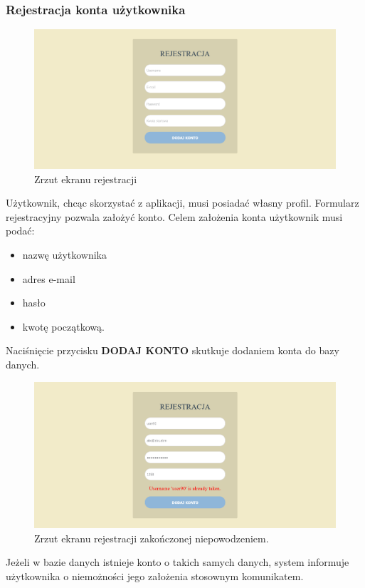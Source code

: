 \documentclass[12pt,a4paper,oneside]{article}
\begin{document}
\subsubsection{Rejestracja konta użytkownika}
\begin{figure}[H]
    \centering
    \includegraphics[width=\hsize,keepaspectratio]{images/register.png}
    \caption{Zrzut ekranu rejestracji}
\end{figure}
Użytkownik, chcąc skorzystać z aplikacji, musi posiadać własny profil. Formularz
rejestracyjny pozwala założyć konto. Celem założenia konta użytkownik musi podać:
\begin{itemize}
    \item nazwę użytkownika
    \item adres e-mail
    \item hasło
    \item kwotę początkową.
\end{itemize}
Naciśnięcie przycisku \textbf{DODAJ KONTO} skutkuje dodaniem konta do bazy danych.

\begin{figure}[H]
    \centering
    \includegraphics[width=\hsize,keepaspectratio]{images/register_account_exists.png}
    \caption{Zrzut ekranu rejestracji zakończonej niepowodzeniem.}
\end{figure}
Jeżeli w bazie danych istnieje konto o takich samych danych, system informuje
użytkownika o niemożności jego założenia stosownym komunikatem.
\end{document}
